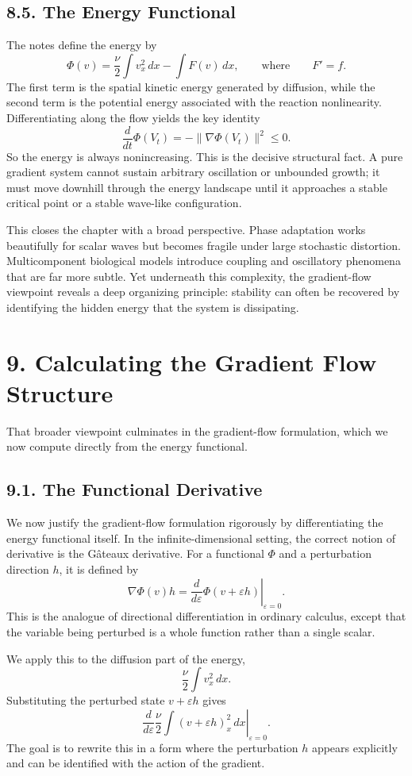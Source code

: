 \documentclass[11pt]{article}
\theoremstyle{definition}
\theoremstyle{remark}
\begin{document}
\subsection*{8.5. The Energy Functional}
The notes define the energy by
\[
\Phi(v)=\frac{\nu}{2}\int v_x^2\,dx-\int F(v)\,dx,
\qquad\text{where}\qquad
F'=f.
\]
The first term is the spatial kinetic energy generated by diffusion, while the second term is the potential energy associated with the reaction nonlinearity. Differentiating along the flow yields the key identity
\[
\frac{d}{dt}\Phi(V_t)=-\|\nabla\Phi(V_t)\|^2\le 0.
\]
So the energy is always nonincreasing. This is the decisive structural fact. A pure gradient system cannot sustain arbitrary oscillation or unbounded growth; it must move downhill through the energy landscape until it approaches a stable critical point or a stable wave-like configuration.

This closes the chapter with a broad perspective. Phase adaptation works beautifully for scalar waves but becomes fragile under large stochastic distortion. Multicomponent biological models introduce coupling and oscillatory phenomena that are far more subtle. Yet underneath this complexity, the gradient-flow viewpoint reveals a deep organizing principle: stability can often be recovered by identifying the hidden energy that the system is dissipating.

\section*{9. Calculating the Gradient Flow Structure}
That broader viewpoint culminates in the gradient-flow formulation, which we now compute directly from the energy functional.

\subsection*{9.1. The Functional Derivative}
We now justify the gradient-flow formulation rigorously by differentiating the energy functional itself. In the infinite-dimensional setting, the correct notion of derivative is the G\^ateaux derivative. For a functional \(\Phi\) and a perturbation direction \(h\), it is defined by
\[
\nabla\Phi(v)h
=
\left.\frac{d}{d\varepsilon}\Phi(v+\varepsilon h)\right|_{\varepsilon=0}.
\]
This is the analogue of directional differentiation in ordinary calculus, except that the variable being perturbed is a whole function rather than a single scalar.

We apply this to the diffusion part of the energy,
\[
\frac{\nu}{2}\int v_x^2\,dx.
\]
Substituting the perturbed state \(v+\varepsilon h\) gives
\[
\left.\frac{d}{d\varepsilon}\frac{\nu}{2}\int (v+\varepsilon h)_x^2\,dx\right|_{\varepsilon=0}.
\]
The goal is to rewrite this in a form where the perturbation \(h\) appears explicitly and can be identified with the action of the gradient.
\end{document}
